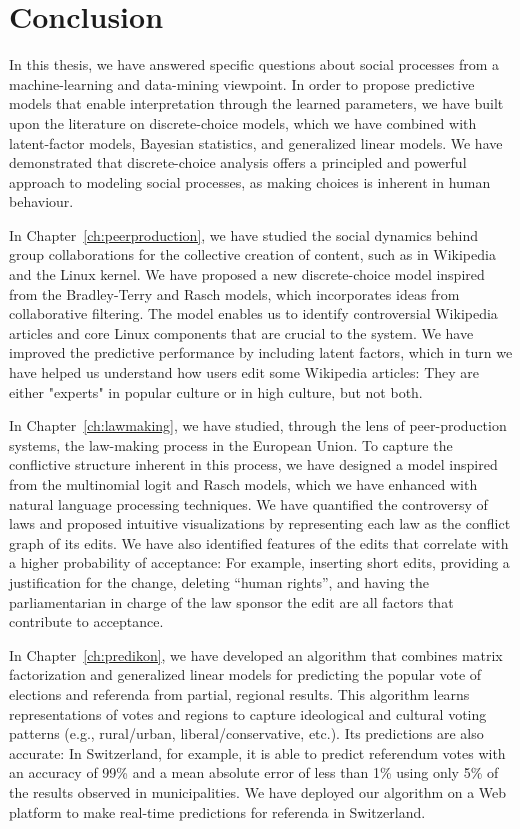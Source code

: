 \chapter{Conclusion}
\label{ch:conclusion}

In this thesis, we have answered specific questions about social processes from a machine-learning and data-mining viewpoint.
In order to propose predictive models that enable interpretation through the learned parameters, we have built upon the literature on discrete-choice models, which we have combined with latent-factor models, Bayesian statistics, and generalized linear models.
We have demonstrated that discrete-choice analysis offers a principled and powerful approach to modeling social processes, as making choices is inherent in human behaviour.

In Chapter~\ref{ch:peerproduction}, we have studied the social dynamics behind group collaborations for the collective creation of content, such as in Wikipedia and the Linux kernel.
We have proposed a new discrete-choice model inspired from the Bradley-Terry and Rasch models, which incorporates ideas from collaborative filtering.
The model enables us to identify controversial Wikipedia articles and core Linux components that are crucial to the system.
We have improved the predictive performance by including latent factors, which in turn we have helped us understand how users edit some Wikipedia articles:
They are either "experts" in popular culture or in high culture, but not both.

In Chapter~\ref{ch:lawmaking}, we have studied, through the lens of peer-production systems, the law-making process in the European Union.
To capture the conflictive structure inherent in this process, we have designed a model inspired from the multinomial logit and Rasch models, which we have enhanced with natural language processing techniques.
We have quantified the controversy of laws and proposed intuitive visualizations by representing each law as the conflict graph of its edits.
We have also identified features of the edits that correlate with a higher probability of acceptance:
For example, inserting short edits, providing a justification for the change, deleting ``human rights'', and having the parliamentarian in charge of the law sponsor the edit are all factors that contribute to acceptance.

In Chapter~\ref{ch:predikon}, we have developed an algorithm that combines matrix factorization and generalized linear models for predicting the popular vote of elections and referenda from partial, regional results.
This algorithm learns representations of votes and regions to capture ideological and cultural voting patterns (e.g., rural/urban, liberal/conservative, etc.).
Its predictions are also accurate:
In Switzerland, for example, it is able to predict referendum votes with an accuracy of 99\% and a mean absolute error of less than 1\% using only 5\% of the results observed in municipalities.
We have deployed our algorithm on a Web platform to make real-time predictions for referenda in Switzerland.

